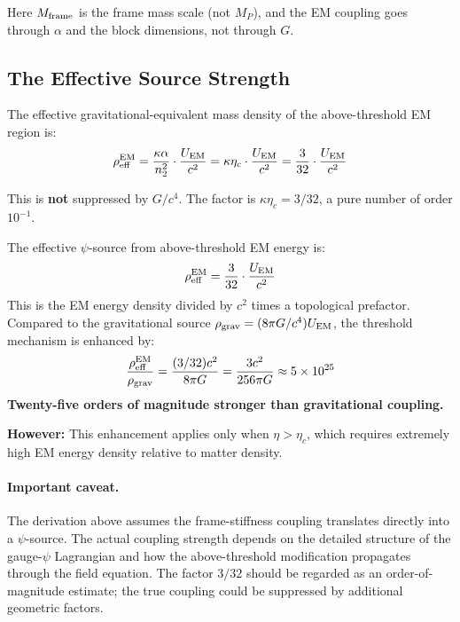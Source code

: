 \documentclass[12pt,a4paper]{article}
\begin{document}
Here $M_{\rm frame}$ is the frame mass scale (not $M_P$), and the EM coupling
goes through $\alpha$ and the block dimensions, not through $G$.

\subsection{The Effective Source Strength}

The effective gravitational-equivalent mass density of the above-threshold
EM region is:
\begin{equation}
\rho_{\rm eff}^{\rm EM} = \frac{\kappa \alpha}{n_2^2} \cdot \frac{U_{\rm EM}}{c^2}
= \kappa \eta_c \cdot \frac{U_{\rm EM}}{c^2}
= \frac{3}{32} \cdot \frac{U_{\rm EM}}{c^2}
\label{eq:rho-eff-em}
\end{equation}

This is \textbf{not} suppressed by $G/c^4$.  The factor is $\kappa \eta_c = 3/32$,
a pure number of order $10^{-1}$.

\begin{tcolorbox}[colback=red!5!white, colframe=red!60!black,
  title=The Key Result: Bypassing $G/c^4$]
The effective $\psi$-source from above-threshold EM energy is:
\begin{equation}
\rho_{\rm eff}^{\rm EM} = \frac{3}{32} \cdot \frac{U_{\rm EM}}{c^2}
\end{equation}
This is the EM energy density divided by $c^2$ times a topological prefactor.
Compared to the gravitational source $\rho_{\rm grav} = (8\pi G/c^4) U_{\rm EM}$,
the threshold mechanism is enhanced by:
\begin{equation}
\frac{\rho_{\rm eff}^{\rm EM}}{\rho_{\rm grav}} = \frac{(3/32) c^2}{8\pi G}
= \frac{3 c^2}{256\pi G} \approx 5 \times 10^{25}
\end{equation}
\textbf{Twenty-five orders of magnitude stronger than gravitational coupling.}

\textbf{However:} This enhancement applies only when $\eta > \eta_c$, which
requires extremely high EM energy density relative to matter density.
\end{tcolorbox}

\paragraph{Important caveat.}
The derivation above assumes the frame-stiffness coupling translates
directly into a $\psi$-source.  The actual coupling strength depends on
the detailed structure of the gauge-$\psi$ Lagrangian and how the
above-threshold modification propagates through the field equation.
The factor $3/32$ should be regarded as an order-of-magnitude estimate;
the true coupling could be suppressed by additional geometric factors.
\end{document}
